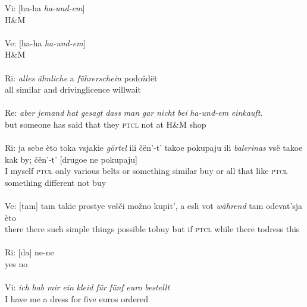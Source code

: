 \gll Vi: [ha-ha \textit{ha-und-em}]\\
	{} {} H{\&}M\\
	\glt \hfill \\
	
\gll Ve: [ha-ha \textit{ha-und-em}]\\
	{} {} H{\&}M\\
\glt \hfill \\

\gll Ri: \textit{alles} \textit{ähnliche} a \textit{führerschein} podoždët\\
	{}  all similar and driving\textunderscore{}licence will\textunderscore{}wait\\
\glt \hfill \\

\gll Re: \textit{aber} \textit{jemand} \textit{hat} \textit{gesagt} \textit{dass} \textit{man} \textit{gar} \textit{nicht} \textit{bei} \textit{ha-und-em} \phantom{mm} \phantom{mm} \phantom{mn} \textit{einkauft}.\\
	{} but someone has said that they \textsc{ptcl} not at H{\&}M {} {} {} shop\\
\glt \hfill \\

\gll Ri: ja sebe èto toka vsjakie \textit{görtel} ili čën'-t' takoe pokupaju
ili \phantom{nn} \textit{balerinas} vsë takoe kak by; čën'-t' [drugoe ne pokupaju]\\
	{} I myself \textsc{ptcl} only various belts or something similar buy or {} {} all that like \textsc{ptcl} something different not buy \\
\glt \hfill \\

\gll Ve: [tam] tam takie prostye vešči možno kupit', a esli vot \phantom{mmm} \phantom{nn}  \textit{während} tam odevat'sja èto\\
    {} there there such simple things possible to\textunderscore{}buy but if \textsc{ptcl} {} {} while there to\textunderscore{}dress this\\
\glt \hfill \\
    
\gll Ri: [da] ne-ne\\
    {} {yes} no\\
\glt \hfill \\

\gll Vi: \textit{ich} \textit{hab} \textit{mir} \textit{ein} \textit{kleid} \textit{für} \textit{fünf} \textit{euro} \textit{bestellt}\\
    {} I have me a dress for five euros ordered\\
\glt \hfill \\

